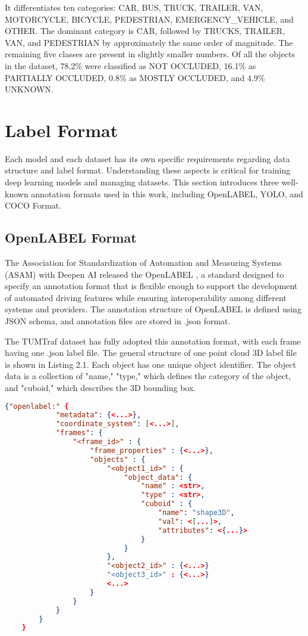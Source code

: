 It differentiates ten categories: CAR, BUS, TRUCK, TRAILER, VAN, MOTORCYCLE, BICYCLE, PEDESTRIAN, EMERGENCY\_VEHICLE, and OTHER. The dominant category is CAR, followed by TRUCKS, TRAILER, VAN, and PEDESTRIAN by approximately the same order of magnitude. The remaining five classes are present in slightly smaller numbers. Of all the objects in the dataset, 78.2\% were classified as NOT OCCLUDED, 16.1\% as PARTIALLY OCCLUDED, 0.8\% as MOSTLY OCCLUDED, and 4.9\% UNKNOWN. 

\section{Label Format} \label{sec:label format}

Each model and each dataset has its own specific requirements regarding data structure and label format. Understanding these aspects is critical for training deep learning models and managing datasets. This section introduces three well-known annotation formats used in this work, including OpenLABEL, YOLO, and COCO Format.

\subsection{OpenLABEL Format} \label{section:openlabel}

The Association for Standardization of Automation and Measuring Systems (ASAM) with Deepen AI released the OpenLABEL \cite{openlabel}, a standard designed to specify an annotation format that is flexible enough to support the development of automated driving features while ensuring interoperability among different systems and providers. The annotation structure of OpenLABEL is defined using JSON schema, and annotation files are stored in .json format.

The TUMTraf dataset has fully adopted this annotation format, with each frame having one .json label file. The general structure of one point cloud 3D label file is shown in Listing 2.1. Each object has one unique object identifier. The object data is a collection of "name," "type," which defines the category of the object, and "cuboid," which describes the 3D bounding box. 

\begin{lstlisting}[language=json, caption={Illutration of OpenLABEL Annotation JSON Structure}, label=lst:openlabel_structure]
	{"openlabel:" {
			"metadata": {<...>},
			"coordinate_system": [<...>],
			"frames": {
				"<frame_id>" : {
					"frame_properties" : {<...>},
					"objects" : {
						"<object1_id>" : {
							"object_data": {
								"name" : <str>, 
								"type" : <str>, 
								"cuboid" : {
									"name": "shape3D",
									"val": <[...]>,
									"attributes": <{...}>
								}
							}
						},
						"<object2_id>" : {<...>}
						"<object3_id>" : {<...>}
						<...>
					}
				}
			}
		}
	}
\end{lstlisting}

